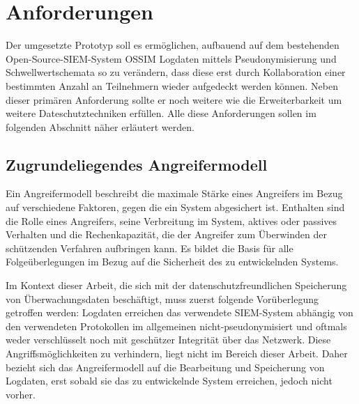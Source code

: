 \section{Anforderungen}

\label{sec_impl_requirements}

Der umgesetzte Prototyp soll es ermöglichen, aufbauend auf dem bestehenden Open-Source-SIEM-System OSSIM Logdaten mittels Pseudonymisierung und Schwellwertschemata so zu verändern, dass diese erst durch Kollaboration einer bestimmten Anzahl an Teilnehmern wieder aufgedeckt werden können. Neben dieser primären Anforderung sollte er noch weitere wie die Erweiterbarkeit um weitere Dateschutztechniken erfüllen. Alle diese Anforderungen sollen im folgenden Abschnitt näher erläutert werden.

\subsection*{Zugrundeliegendes Angreifermodell}


Ein Angreifermodell beschreibt die maximale Stärke eines Angreifers im Bezug auf verschiedene Faktoren, gegen die ein System abgesichert ist. Enthalten sind die Rolle eines Angreifers, seine Verbreitung im System, aktives oder passives Verhalten und die Rechenkapazität, die der Angreifer zum Überwinden der schützenden Verfahren aufbringen kann. Es bildet die Basis für alle Folgeüberlegungen im Bezug auf die Sicherheit des zu entwickelnden Systems.

Im Kontext dieser Arbeit, die sich mit der datenschutzfreundlichen Speicherung von Überwachungsdaten beschäftigt, muss zuerst folgende Vorüberlegung getroffen werden: Logdaten erreichen das verwendete SIEM-System abhängig von den verwendeten Protokollen im allgemeinen nicht-pseudonymisiert und oftmals weder verschlüsselt noch mit geschützer Integrität über das Netzwerk. 
Diese Angriffsmöglichkeiten zu verhindern, liegt nicht im Bereich dieser Arbeit. Daher bezieht sich das Angreifermodell auf die Bearbeitung und Speicherung von Logdaten, erst sobald sie das zu entwickelnde System erreichen, jedoch nicht vorher.

